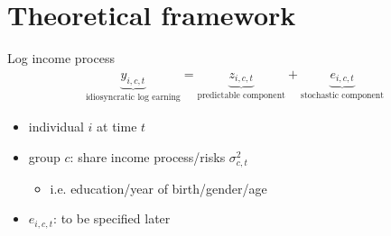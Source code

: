 \documentclass{beamer}
\begin{document}

\section{Theoretical framework}

\begin{frame}{Log income process}
	\begin{equation*}
		\begin{split}
			\underbrace{y_{i,c,t}}_{\text{idiosyncratic log earning}} = \underbrace{z_{i,c,t}}_{\text{predictable component}}  + \underbrace{e_{i,c,t}}_{\text{stochastic component}}
		\end{split} 
	\end{equation*}
	
	\begin{itemize}
		\item individual \(i\) at time \(t\) 
		\item group $c$: share income process/risks $\sigma^2_{c,t}$
		\begin{itemize}
			\item i.e. education/year of birth/gender/age
		\end{itemize}
		\item $e_{i,c,t}$: to be specified later
	\end{itemize}
\end{frame}
\end{document}
